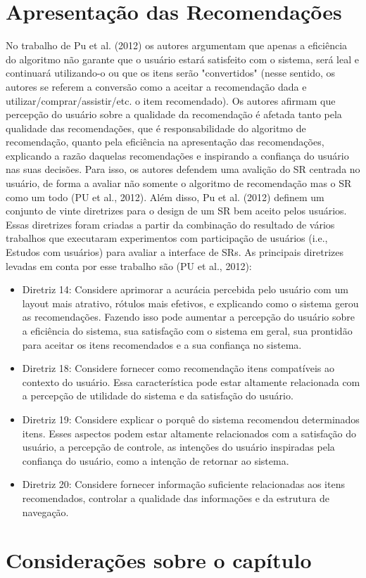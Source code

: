 \section{Apresentação das Recomendações}

No trabalho de Pu et al. (2012) os autores argumentam que apenas a eficiência do algoritmo não garante que o usuário estará satisfeito com o sistema, será leal e continuará utilizando-o ou que os itens serão "convertidos" (nesse sentido, os autores se referem a conversão como a aceitar a recomendação dada e utilizar/comprar/assistir/etc. o item recomendado). Os autores afirmam que percepção do usuário sobre a qualidade da recomendação é afetada tanto pela qualidade das recomendações, que é responsabilidade do algoritmo de recomendação, quanto pela eficiência na apresentação das recomendações, explicando a razão daquelas recomendações e inspirando a confiança do usuário nas suas decisões. Para isso, os autores defendem uma avalição do SR centrada no usuário, de forma a avaliar não somente o algoritmo de recomendação mas o SR como um todo (PU et al., 2012).
Além disso, Pu et al. (2012) definem um conjunto de vinte diretrizes para o design de um SR bem aceito pelos usuários. Essas diretrizes foram criadas a partir da combinação do resultado de vários trabalhos que executaram experimentos com participação de usuários (i.e., Estudos com usuários) para avaliar a interface de SRs. As principais diretrizes levadas em conta por esse trabalho são (PU et al., 2012):

\begin{itemize}
\item Diretriz 14: Considere aprimorar a acurácia percebida pelo usuário com um layout mais atrativo, rótulos mais efetivos, e explicando como o sistema gerou as recomendações. Fazendo isso pode aumentar a percepção do usuário sobre a eficiência do sistema, sua satisfação com o sistema em geral, sua prontidão para aceitar os itens recomendados e a sua confiança no sistema.
\item Diretriz 18: Considere fornecer como recomendação itens compatíveis ao contexto do usuário. Essa característica pode estar altamente relacionada com a percepção de utilidade do sistema e da satisfação do usuário.
\item Diretriz 19: Considere explicar o porquê do sistema recomendou determinados itens. Esses aspectos podem estar altamente relacionados com a satisfação do usuário, a percepção de controle, as intenções do usuário inspiradas pela confiança do usuário, como a intenção de retornar ao sistema.
\item Diretriz 20: Considere fornecer informação suficiente relacionadas aos itens recomendados, controlar a qualidade das informações e da estrutura de navegação.
\end{itemize}

\section{Considerações sobre o capítulo}
